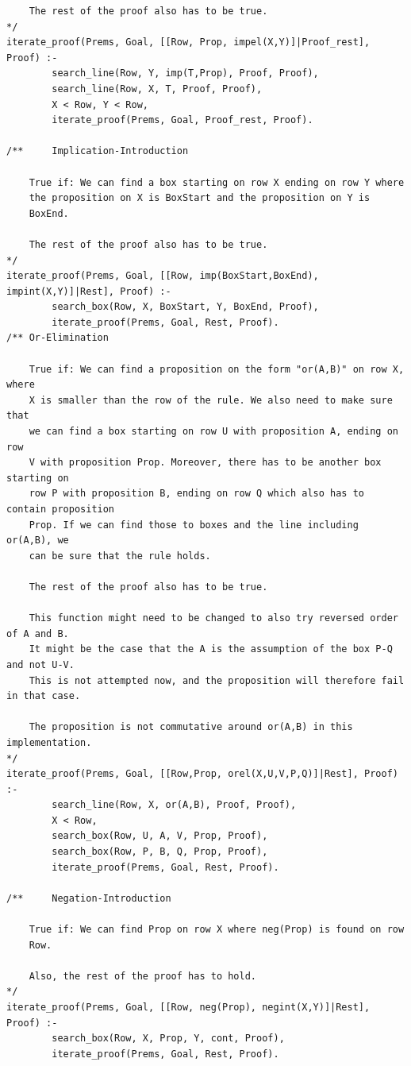 \documentclass[a4paper]{article}
\begin{document}
\begin{verbatim}
	The rest of the proof also has to be true.
*/
iterate_proof(Prems, Goal, [[Row, Prop, impel(X,Y)]|Proof_rest], Proof) :-
        search_line(Row, Y, imp(T,Prop), Proof, Proof),
        search_line(Row, X, T, Proof, Proof),
        X < Row, Y < Row,
        iterate_proof(Prems, Goal, Proof_rest, Proof).

/**     Implication-Introduction
	
	True if: We can find a box starting on row X ending on row Y where
	the proposition on X is BoxStart and the proposition on Y is
	BoxEnd.
        
	The rest of the proof also has to be true.
*/
iterate_proof(Prems, Goal, [[Row, imp(BoxStart,BoxEnd), impint(X,Y)]|Rest], Proof) :-
        search_box(Row, X, BoxStart, Y, BoxEnd, Proof),
        iterate_proof(Prems, Goal, Rest, Proof).
/**	Or-Elimination
	
	True if: We can find a proposition on the form "or(A,B)" on row X, where
	X is smaller than the row of the rule. We also need to make sure that
	we can find a box starting on row U with proposition A, ending on row
	V with proposition Prop. Moreover, there has to be another box starting on
	row P with proposition B, ending on row Q which also has to contain proposition
	Prop. If we can find those to boxes and the line including or(A,B), we
	can be sure that the rule holds.
	
	The rest of the proof also has to be true.
	
	This function might need to be changed to also try reversed order of A and B.
	It might be the case that the A is the assumption of the box P-Q and not U-V.
	This is not attempted now, and the proposition will therefore fail in that case.
	
	The proposition is not commutative around or(A,B) in this implementation.
*/
iterate_proof(Prems, Goal, [[Row,Prop, orel(X,U,V,P,Q)]|Rest], Proof) :-
        search_line(Row, X, or(A,B), Proof, Proof),
        X < Row,
        search_box(Row, U, A, V, Prop, Proof),
        search_box(Row, P, B, Q, Prop, Proof),
        iterate_proof(Prems, Goal, Rest, Proof).

/**     Negation-Introduction

	True if: We can find Prop on row X where neg(Prop) is found on row
	Row.
	
	Also, the rest of the proof has to hold.
*/
iterate_proof(Prems, Goal, [[Row, neg(Prop), negint(X,Y)]|Rest], Proof) :-
        search_box(Row, X, Prop, Y, cont, Proof),
        iterate_proof(Prems, Goal, Rest, Proof).


\end{verbatim}
\end{document}
